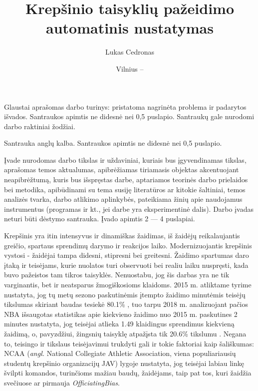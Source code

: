 \documentclass{VUMIFPSbakalaurinis}
\institute{Informatikos institutas}  %
\title{Krepšinio taisyklių pažeidimo automatinis nustatymas}
\author{Lukas Cedronas}
\date{Vilnius – \the\year}
\begin{document}
\maketitle


Glaustai aprašomas darbo turinys: pristatoma nagrinėta problema ir padarytos
išvados. Santraukos apimtis ne didesnė nei 0,5 puslapio. Santraukų gale
nurodomi darbo raktiniai žodžiai. 

Santrauka anglų kalba. Santraukos apimtis ne didesnė nei 0,5 puslapio.

\tableofcontents

Įvade nurodomas darbo tikslas ir uždaviniai, kuriais bus įgyvendinamas tikslas,
aprašomas temos aktualumas, apibrėžiamas tiriamasis objektas akcentuojant
neapibrėžtumą, kuris bus išspręstas darbe, aptariamos teorinės darbo prielaidos
bei metodika, apibūdinami su tema susiję literatūros ar kitokie šaltiniai,
temos analizės tvarka, darbo atlikimo aplinkybės, pateikiama žinių apie
naudojamus instrumentus (programas ir kt., jei darbe yra eksperimentinė dalis).
Darbo įvadas neturi būti dėstymo santrauka. Įvado apimtis 2 –– 4 puslapiai.


Krepšinis yra itin intensyvus ir dinamiškas žaidimas, iš žaidėjų reikalaujantis greičio, spartaus sprendimų darymo ir reakcijos laiko. Modernizuojantis krepšinis vystosi - žaidėjai tampa didesni, stipresni bei greitesni. Žaidimo spartumas daro įtaką ir teisėjams, kurie nuolatos turi observuoti bei realiu laiku nuspręsti, kada buvo pažeistos tam tikros taisyklės. Nenuostabu, jog šis darbas yra ne tik varginantis, bet ir neatsparus žmogiškosioms klaidoms. 2015 m. atliktame tyrime nustatyta, jog tų metų sezono paskutinėmis įtempto žaidimo minutėmis teisėjų tikslumas skiriant baudas tesiekė 80.1\% \cite{Deutscher}, tuo tarpu 2018 m. analizuojant pačios NBA išsaugotas statistikas apie kiekvieno žaidimo nuo 2015 m. paskutines 2 minutes nustatyta, jog teisėjai atlieka 1.49 klaidingus sprendimus kiekvieną žaidimą, o, pavyzdžiui, žingsnių taisyklę atpažįsta tik 20.6\% tikslumu \cite{SiglerK}. Negana to, teisingo ir tikslaus teisėjavimui trukdyti gali ir tokie faktoriai kaip šališkumas: NCAA (\textit{angl.} National Collegiate Athletic Association, viena populiariausių studentų krepšinio organizacijų JAV) lygoje nustatyta, jog teisėjai labiau linkę švilpti komandos, turinčioms mažiau baudų, žaidėjams, taip pat tos, kuri žaidžia svečiuose ar pirmauja \textit{OfficiatingBias}. 
\end{document}
